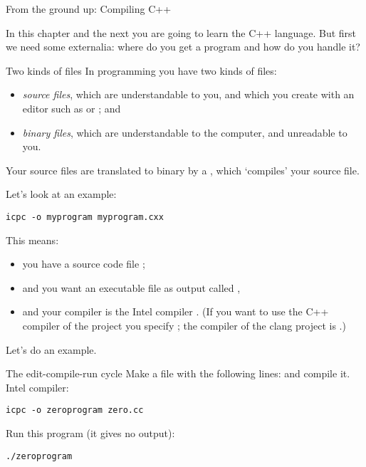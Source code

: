 
 {From the ground up: Compiling C++}

In this chapter and the next you are going to learn the C++
language. But first we need some externalia:
where do you get a program and how do you handle it?

\begin{block}{Two kinds of files}
  \label{sl:sourcebinary}
  In programming you have two kinds of files:
  \begin{itemize}
  \item \emph{source files}, which are understandable
    to you, and which you create with an editor such as  or
    ; and
  \item \emph{binary files}, which are understandable
    to the computer, and unreadable to you.
  \end{itemize}
  Your source files are translated to binary by a
  , which `compiles' your source file.
\end{block}

Let's look at an example:
\begin{verbatim}
icpc -o myprogram myprogram.cxx
\end{verbatim}
This means:
\begin{itemize}
\item you have a source code file ;
\item and you want an executable file as output called ,
\item and your compiler is the Intel compiler .
  (If you want to use the C++ compiler of the
   project you specify ;
  the compiler of the clang project is .)
\end{itemize}

Let's do an example.

\begin{exercise}{The edit-compile-run cycle}
\label{ex:compile-cycle}
  Make a file  with the following lines:
  and compile it. Intel compiler:
\begin{verbatim}
icpc -o zeroprogram zero.cc
\end{verbatim}
Run this program (it gives no output):
\begin{verbatim}
./zeroprogram
\end{verbatim}
\end{exercise}

